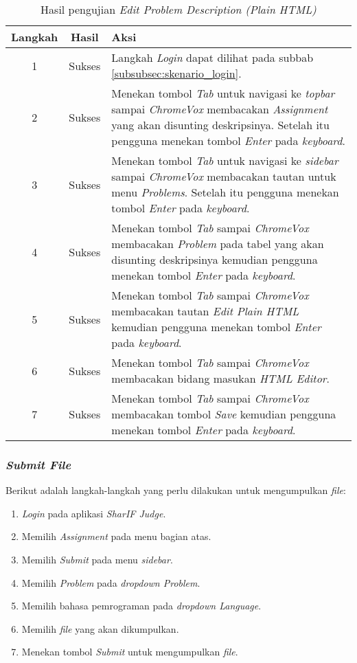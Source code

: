 \begin{table}[H]
	\centering
	\caption{Hasil pengujian \textit{Edit Problem Description (Plain HTML)}}
	\label{tab:hasil_edit_problem_description_plain_html}
	\begin{tabular}{|c|c|p{12cm}|}
		\toprule
		Langkah & Hasil & Aksi\\
		\midrule
		1 & Sukses & Langkah \textit{Login} dapat dilihat pada subbab \ref{subsubsec:skenario_login}.\\
		2 & Sukses & Menekan tombol \textit{Tab} untuk navigasi ke \textit{topbar} sampai \textit{ChromeVox} membacakan \textit{Assignment} yang akan disunting deskripsinya. Setelah itu pengguna menekan tombol \textit{Enter} pada \textit{keyboard}.\\
		3 & Sukses & Menekan tombol \textit{Tab} untuk navigasi ke \textit{sidebar} sampai \textit{ChromeVox} membacakan tautan untuk menu \textit{Problems}. Setelah itu pengguna menekan tombol \textit{Enter} pada \textit{keyboard}.\\
		4 & Sukses & Menekan tombol \textit{Tab} sampai \textit{ChromeVox} membacakan \textit{Problem} pada tabel yang akan disunting deskripsinya kemudian pengguna menekan tombol \textit{Enter} pada \textit{keyboard}.\\
		5 & Sukses & Menekan tombol \textit{Tab} sampai \textit{ChromeVox} membacakan tautan \textit{Edit Plain HTML} kemudian pengguna menekan tombol \textit{Enter} pada \textit{keyboard}.\\
		6 & Sukses & Menekan tombol \textit{Tab} sampai \textit{ChromeVox} membacakan bidang masukan \textit{HTML Editor}.\\
		7 & Sukses & Menekan tombol \textit{Tab} sampai \textit{ChromeVox} membacakan tombol \textit{Save} kemudian pengguna menekan tombol \textit{Enter} pada \textit{keyboard}.\\
		\bottomrule
	\end{tabular}
\end{table}

\subsubsection{\textit{Submit File}}
\label{subsubsec:skenario_submit}
Berikut adalah langkah-langkah yang perlu dilakukan untuk mengumpulkan \textit{file}:

\begin{enumerate}
	\item \textit{Login} pada aplikasi \textit{SharIF Judge}.
	\item Memilih \textit{Assignment} pada menu bagian atas.
	\item Memilih \textit{Submit} pada menu \textit{sidebar}.
	\item Memilih \textit{Problem} pada \textit{dropdown Problem}.
	\item Memilih bahasa pemrograman pada \textit{dropdown Language}.
	\item Memilih \textit{file} yang akan dikumpulkan.
	\item Menekan tombol \textit{Submit} untuk mengumpulkan \textit{file}.
\end{enumerate}

